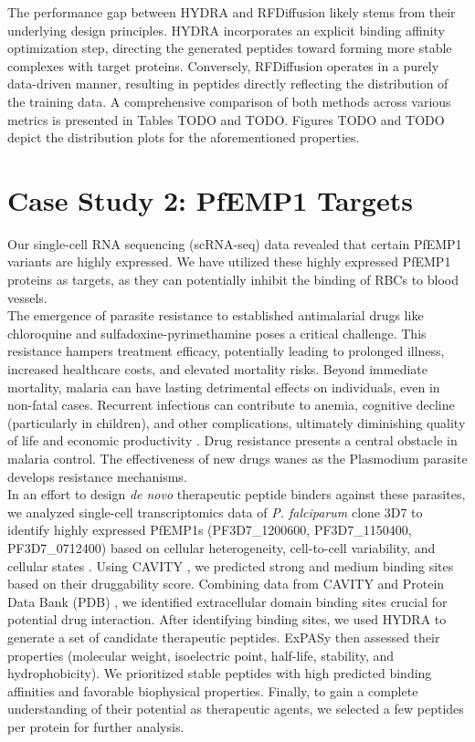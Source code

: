 The performance gap between HYDRA and RFDiffusion likely stems from their underlying design principles. HYDRA incorporates an explicit binding affinity optimization step, directing the generated peptides toward forming more stable complexes with target proteins. Conversely, RFDiffusion operates in a purely data-driven manner, resulting in peptides directly reflecting the distribution of the training data.
A comprehensive comparison of both methods across various metrics is presented in Tables TODO and TODO. Figures TODO and TODO depict the distribution plots for the aforementioned properties.

\section{Case Study 2: PfEMP1 Targets}
Our single-cell RNA sequencing (scRNA-seq) data revealed that certain PfEMP1 variants are highly expressed. We have utilized these highly expressed PfEMP1 proteins as targets, as they can potentially inhibit the binding of RBCs to blood vessels. \\

The emergence of parasite resistance to established antimalarial drugs like chloroquine and sulfadoxine-pyrimethamine poses a critical challenge. This resistance hampers treatment efficacy, potentially leading to prolonged illness, increased healthcare costs, and elevated mortality risks. Beyond immediate mortality, malaria can have lasting detrimental effects on individuals, even in non-fatal cases. Recurrent infections can contribute to anemia, cognitive decline (particularly in children), and other complications, ultimately diminishing quality of life and economic productivity \cite{shukla2023supervised}. Drug resistance presents a central obstacle in malaria control. The effectiveness of new drugs wanes as the Plasmodium parasite develops resistance mechanisms. \\

In an effort to design \textit{de novo} therapeutic peptide binders against these parasites, we analyzed single-cell transcriptomics data of \textit{P. falciparum} clone 3D7 to identify highly expressed PfEMP1s (PF3D7\_1200600, PF3D7\_1150400, PF3D7\_0712400) based on cellular heterogeneity, cell-to-cell variability, and cellular states \cite{choudhuri2024computational}. Using CAVITY \cite{Yuan2013}, we predicted strong and medium binding sites based on their druggability score. Combining data from CAVITY and Protein Data Bank (PDB) \cite{Berman2000}, we identified extracellular domain binding sites crucial for potential drug interaction. After identifying binding sites, we used HYDRA to generate a set of candidate therapeutic peptides. ExPASy \cite{gasteiger2003expasy} then assessed their properties (molecular weight, isoelectric point, half-life, stability, and hydrophobicity). We prioritized stable peptides with high predicted binding affinities and favorable biophysical properties. Finally, to gain a complete understanding of their potential as therapeutic agents, we selected a few peptides per protein for further analysis. \\

